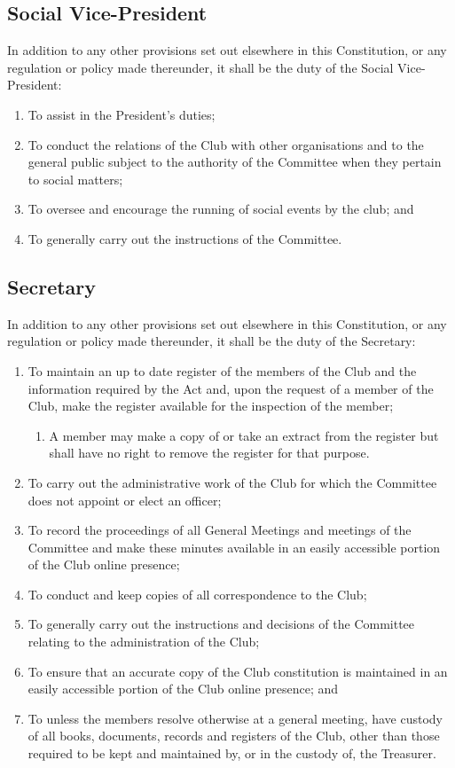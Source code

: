 \documentclass[11pt]{article} %
\begin{document}
\subsection{Social Vice-President}
In addition to any other provisions set out elsewhere in this Constitution, or any regulation or policy made thereunder, it shall be the duty of the Social Vice-President:
\begin{enumerate}
	\item To assist in the President's duties;
	\item To conduct the relations of the Club with other organisations and to the general public subject to the authority of the Committee when they pertain to social matters;
	\item To oversee and encourage the running of social events by the club; and
	\item To generally carry out the instructions of the Committee.
\end{enumerate}

\subsection{Secretary}
In addition to any other provisions set out elsewhere in this Constitution, or any regulation or policy made thereunder, it shall be the duty of the Secretary:
\begin{enumerate}
	\item To maintain an up to date register of the members of the Club and the information required by the Act and, upon the request of a member of the Club, make the register available for the inspection of the member;
	\begin{enumerate}[1.]
			\item A member may make a copy of or take an extract from the register but shall have no right to remove the register for that purpose.
		\end{enumerate}
	\item To carry out the administrative work of the Club for which the Committee does not appoint or elect an officer;
	\item To record the proceedings of all General Meetings and meetings of the Committee and make these minutes available in an easily accessible portion of the Club online presence;
	\item To conduct and keep copies of all correspondence to the Club;
	\item To generally carry out the instructions and decisions of the Committee relating to the administration of the Club;
	\item To ensure that an accurate copy of the Club constitution is maintained in an easily accessible portion of the Club online presence; and
	\item To unless the members resolve otherwise at a general meeting, have custody of all books, documents, records and registers of the Club, other than those required to be kept and maintained by, or in the custody of, the Treasurer.
\end{enumerate}
\end{document}
